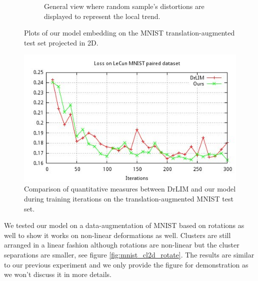 \documentclass[a4paper,12pt]{report}
\begin{document}
\begin{figure}[t]
\begin{subfigure}[t]{0.7\textwidth}
        \caption{General view where random sample's distortions are displayed to represent the local trend.}
    \end{subfigure}
    \caption{Plots of our model embedding on the MNIST translation-augmented test set projected in 2D.}
    \label{fig:mnist_cl2d}
\end{figure}

\begin{figure}[t]
    \begin{center}
        \includegraphics{thesis_figures/final_loss_test2bv7.jpg}
    \end{center}
    \caption{Comparison of quantitative measures between DrLIM and our model during training iterations on the translation-augmented MNIST test set.}
    \label{fig:loss_test_common}
\end{figure}

We tested our model on a data-augmentation of MNIST based on rotations as well to show it works on non-linear deformations as well.
Clusters are still arranged in a linear fashion although rotations are non-linear but the cluster separations are smaller, see figure \ref{fig:mnist_cl2d_rotate}.
The results are similar to our previous experiment and we only provide the figure for demonstration as we won't discuss it in more details.
\end{document}
